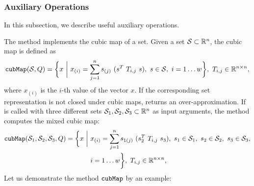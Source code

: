 \subsubsection{Auxiliary Operations}

In this subsection, we describe useful auxiliary operations.


The method  implements the cubic map of a set. Given a set $\mathcal{S} \subset \mathbb{R}^n$, the cubic map is defined as 
\begin{equation*}
	{\normalfont \texttt{cubMap}}(\mathcal{S},Q) = \bigg \{ x ~ \bigg | ~ x_{(i)} = \sum_{j=1}^n s_{(j)} ~(s^T ~T_{i,j}~ s), ~s \in \mathcal{S},~ i = 1 \dots w \bigg \}, ~ T_{i,j} \in \mathbb{R}^{n \times n},
\end{equation*}
where $x_{(i)}$ is the $i$-th value of the vector $x$. If the corresponding set representation is not closed under cubic maps,  returns an over-approximation. If  is called with three different sets $\mathcal{S}_1,\mathcal{S}_2,\mathcal{S}_3 \subset \mathbb{R}^n$ as input arguments, the method computes the mixed cubic map:
\begin{equation*}
\begin{split}
	{\normalfont \texttt{cubMap}}(\mathcal{S}_1,\mathcal{S}_2,\mathcal{S}_3,Q) = \bigg \{ x ~ \bigg | ~ & x_{(i)} = \sum_{j=1}^n s_{1(j)} ~(s_2^T ~T_{i,j}~ s_3), ~s_1 \in \mathcal{S}_1,~s_2 \in \mathcal{S}_2,~s_3 \in \mathcal{S}_3, \\
	& i = 1 \dots w \bigg \}, ~ T_{i,j} \in \mathbb{R}^{n \times n},
\end{split}
\end{equation*}
Let us demonstrate the method ${\normalfont \texttt{cubMap}}$ by an example:

\begin{center}
\begin{minipage}[t]{0.35\textwidth}
	\vspace{10pt}
	\footnotesize
	
\end{minipage}
\begin{minipage}[t]{0.6\textwidth}
	\vspace{0pt}
	\centering
\end{minipage}
\end{center}



